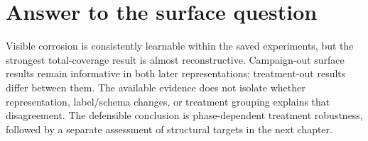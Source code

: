 \FloatBarrier
\section{Answer to the surface question}
Visible corrosion is consistently learnable within the saved experiments, but the strongest total-coverage result is almost reconstructive. Campaign-out surface results remain informative in both later representations; treatment-out results differ between them. The available evidence does not isolate whether representation, label/schema changes, or treatment grouping explains that disagreement. The defensible conclusion is phase-dependent treatment robustness, followed by a separate assessment of structural targets in the next chapter.
